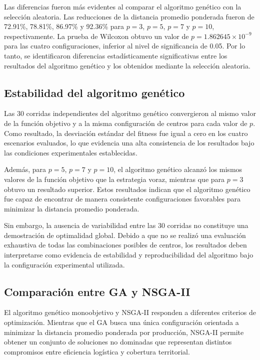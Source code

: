 \documentclass[journal]{IEEEtran}
\begin{document}
Las diferencias fueron más evidentes al comparar el algoritmo genético con la selección aleatoria. Las reducciones de la distancia promedio ponderada fueron de 72.91\%, 78.81\%, 86.97\% y 92.36\% para $p=3$, $p=5$, $p=7$ y $p=10$, respectivamente. La prueba de Wilcoxon obtuvo un valor de $p=1.862645\times10^{-9}$ para las cuatro configuraciones, inferior al nivel de significancia de 0.05. Por lo tanto, se identificaron diferencias estadísticamente significativas entre los resultados del algoritmo genético y los obtenidos mediante la selección aleatoria.

\subsection{Estabilidad del algoritmo genético}

Las 30 corridas independientes del algoritmo genético convergieron al mismo valor de la función objetivo y a la misma configuración de centros para cada valor de $p$. Como resultado, la desviación estándar del fitness fue igual a cero en los cuatro escenarios evaluados, lo que evidencia una alta consistencia de los resultados bajo las condiciones experimentales establecidas.

Además, para $p=5$, $p=7$ y $p=10$, el algoritmo genético alcanzó los mismos valores de la función objetivo que la estrategia voraz, mientras que para $p=3$ obtuvo un resultado superior. Estos resultados indican que el algoritmo genético fue capaz de encontrar de manera consistente configuraciones favorables para minimizar la distancia promedio ponderada.

Sin embargo, la ausencia de variabilidad entre las 30 corridas no constituye una demostración de optimalidad global. Debido a que no se realizó una evaluación exhaustiva de todas las combinaciones posibles de centros, los resultados deben interpretarse como evidencia de estabilidad y reproducibilidad del algoritmo bajo la configuración experimental utilizada.

\subsection{Comparación entre GA y NSGA-II}

El algoritmo genético monoobjetivo y NSGA-II responden a diferentes criterios de optimización. Mientras que el GA busca una única configuración orientada a minimizar la distancia promedio ponderada por producción, NSGA-II permite obtener un conjunto de soluciones no dominadas que representan distintos compromisos entre eficiencia logística y cobertura territorial.
\end{document}
